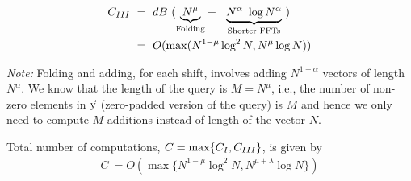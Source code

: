 \begin{enumerate}
	\begin{align*}
	 C_{\RNum{3}} \ &= ~  dB ~ 
	( \underset{\text{Folding} }{\underbrace{N^{\mu}}} + \ \
	\underset{\text{Shorter FFTs} }{\underbrace{N^{\alpha} \ \log N^{\alpha}}} \ )\\
	&= ~O(\max(N^{1-\mu}\log^2 N ,N^{\mu}\log N))
	\end{align*}
	
	
	{\textit{Note:}} Folding and adding, for each shift, involves adding $N^{1-\alpha}$ vectors of length $N^{\alpha}$. We know that the length of the query is $M =N^{\mu}$, i.e., the number of non-zero elements in $\vec{\mathrm{y}}$ (zero-padded version of the query) is $M$ and hence we only need to compute $M$ additions instead of length of the vector $N$.
	
\end{enumerate}

Total number of computations, $C = \max\{C_{\RNum{1}},C_{\RNum{3}}\} $, is given by   
  \begin{align*}
  C ~ = O\left(\max\{N^{1-\mu}\log^2 N, N^{\mu+\lambda}\log N \}\right)
  \end{align*}
  



